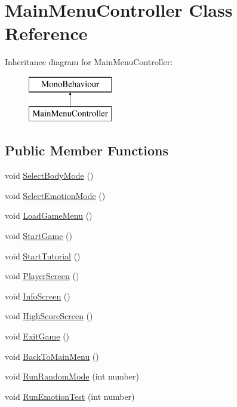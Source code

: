 \hypertarget{class_main_menu_controller}{}\section{Main\+Menu\+Controller Class Reference}
\label{class_main_menu_controller}
Inheritance diagram for Main\+Menu\+Controller\+:\begin{figure}[H]
\begin{center}
\leavevmode
\includegraphics[height=2.000000cm]{class_main_menu_controller}
\end{center}
\end{figure}
\subsection*{Public Member Functions}
\begin{DoxyCompactItemize}
\item 
void \mbox{\hyperlink{class_main_menu_controller_a642c1d5d2362568dc849f4fabe4f4a40}{Select\+Body\+Mode}} ()
\item 
void \mbox{\hyperlink{class_main_menu_controller_a406ca67e38b2bc06b58afa93c16324ec}{Select\+Emotion\+Mode}} ()
\item 
void \mbox{\hyperlink{class_main_menu_controller_af9618b2c3296e06e3a0d3d7296db4232}{Load\+Game\+Menu}} ()
\item 
void \mbox{\hyperlink{class_main_menu_controller_af693059f9f9b501929d35b23257f83ea}{Start\+Game}} ()
\item 
void \mbox{\hyperlink{class_main_menu_controller_ad5a70ec49582ee8eed0d488c0b3a65c1}{Start\+Tutorial}} ()
\item 
void \mbox{\hyperlink{class_main_menu_controller_a83512321247156de46211ed1bd591c8f}{Player\+Screen}} ()
\item 
void \mbox{\hyperlink{class_main_menu_controller_a9727e79dd79b39d3e69401334e890108}{Info\+Screen}} ()
\item 
void \mbox{\hyperlink{class_main_menu_controller_acd870723fa78c2cd858372a0638695f7}{High\+Score\+Screen}} ()
\item 
void \mbox{\hyperlink{class_main_menu_controller_ac932610988eda8e09c4f8051bc27dad8}{Exit\+Game}} ()
\item 
void \mbox{\hyperlink{class_main_menu_controller_a5c5a50efe940a89139c09acf6e0c2526}{Back\+To\+Main\+Menu}} ()
\item 
void \mbox{\hyperlink{class_main_menu_controller_aaa781de40fb0c8a531068e5e26b4ce75}{Run\+Random\+Mode}} (int number)
\item 
void \mbox{\hyperlink{class_main_menu_controller_a22385cbb6d28a3c8757e4b9fd4b72c9d}{Run\+Emotion\+Test}} (int number)
\end{DoxyCompactItemize}
